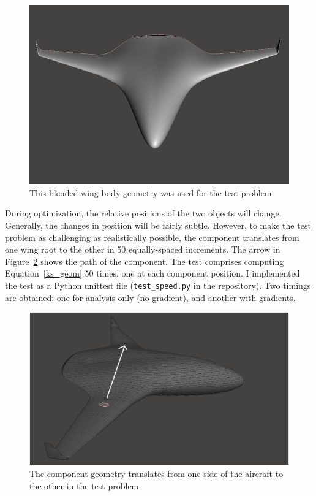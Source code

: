 \documentclass[11pt,letterpaper]{article}
\begin{document}
\begin{figure}[ht]
  \centering
  \includegraphics[width=0.66\linewidth]{figures/bwb_alone.png}
  \caption{This blended wing body geometry was used for the test problem}
  \label{fig:bwb-alone}
\end{figure}

\qquad During optimization, the relative positions of the two objects will change. 
Generally, the changes in position will be fairly subtle.
However, to make the test problem as challenging as realistically possible, the component translates from one wing root to the other in 50 equally-spaced increments.
The arrow in Figure~\ref{fig:bwb-blob} shows the path of the component.
The test comprises computing Equation~\ref{ks_geom} 50 times, one at each component position.
I implemented the test as a Python unittest file (\texttt{test\_speed.py} in the repository).
Two timings are obtained; one for analysis only (no gradient), and another with gradients.

\begin{figure}[ht]
  \centering
  \includegraphics[width=0.80\linewidth]{figures/bwb_With_blob_arrow.png}
  \caption{The component geometry translates from one side of the aircraft to the other in the test problem}
  \label{fig:bwb-blob}
\end{figure}
\end{document}
